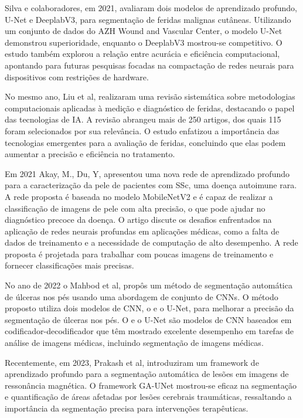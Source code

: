 Silva e colaboradores, em 2021, avaliaram dois modelos de aprendizado profundo, \ac{U-Net} e DeeplabV3, para segmentação de feridas malignas cutâneas. Utilizando um conjunto de dados do AZH Wound and Vascular Center, o modelo \ac{U-Net} demonstrou superioridade, enquanto o DeeplabV3 mostrou-se competitivo. O estudo também explorou a relação entre acurácia e eficiência computacional, apontando para futuras pesquisas focadas na compactação de redes neurais para dispositivos com restrições de hardware.~\cite{silva2021avaliacao}

No mesmo ano, Liu et al, realizaram uma revisão sistemática sobre metodologias computacionais aplicadas à medição e diagnóstico de feridas, destacando o papel das tecnologias de IA. A revisão abrangeu mais de 250 artigos, dos quais 115 foram selecionados por sua relevância. O estudo enfatizou a importância das tecnologias emergentes para a avaliação de feridas, concluindo que elas podem aumentar a precisão e eficiência no tratamento.~\cite{liu2021computational}

Em 2021 Akay, M., Du, Y, apresentou uma nova rede de aprendizado profundo para a caracterização da pele de pacientes com \ac{SSc}, uma doença autoimune rara. A rede proposta é baseada no modelo \ac{MobileNetV2} e é capaz de realizar a classificação de imagens de pele com alta precisão, o que pode ajudar no diagnóstico precoce da doença. O artigo discute os desafios enfrentados na aplicação de redes neurais profundas em aplicações médicas, como a falta de dados de treinamento e a necessidade de computação de alto desempenho. A rede proposta é projetada para trabalhar com poucas imagens de treinamento e fornecer classificações mais precisas.~\cite{akay2021deep}

No ano de 2022 o Mahbod et al, propôs um método de segmentação automática de úlceras nos pés usando uma abordagem de conjunto de \acp{CNN}. O método proposto utiliza dois modelos de CNN, o  e o \ac{U-Net}, para melhorar a precisão da segmentação de úlceras nos pés. O  e o \ac{U-Net} são modelos de CNN baseados em codificador-decodificador que têm mostrado excelente desempenho em tarefas de análise de imagens médicas, incluindo segmentação de imagens médicas.~\cite{mahbod2022automatic}

Recentemente, em 2023, Prakash et al, introduziram um framework de aprendizado profundo para a segmentação automática de lesões em imagens de ressonância magnética. O framework \ac{GA-UNet} mostrou-se eficaz na segmentação e quantificação de áreas afetadas por lesões cerebrais traumáticas, ressaltando a importância da segmentação precisa para intervenções terapêuticas.~\cite{prakash2023end}


